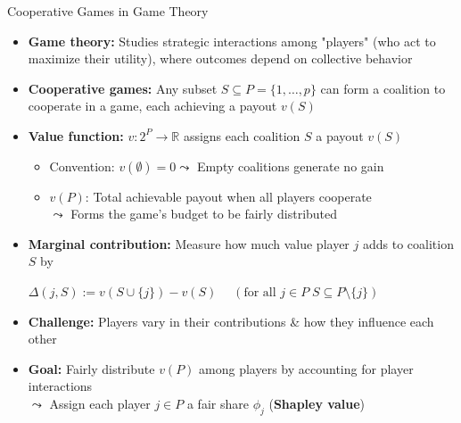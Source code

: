 \documentclass[11pt,compress,t,notes=noshow, aspectratio=169, xcolor=table]{beamer}
\begin{document}
\begin{frame}{Cooperative Games in Game Theory }
\begin{itemize}%
  \item \textbf{Game theory:} Studies strategic interactions among "players" (who act to maximize their utility), where outcomes depend on collective behavior
  \item \textbf{Cooperative games:} Any subset $S \subseteq P = \{1, \ldots, p\}$ can form a coalition to cooperate in a game, each achieving a payout $v(S)$
  \pause
  \item \textbf{Value function:} $v: 2^P \rightarrow \mathbb{R}$ assigns each coalition $S$ a payout $v(S)$ 
  \begin{itemize}
      \item Convention: $v(\emptyset) = 0 \leadsto$  Empty coalitions generate no gain
      \item $v(P)$: Total achievable payout when all players cooperate\\
      $\leadsto$ Forms the game's budget to be fairly distributed
  \end{itemize}%
    \item \textbf{Marginal contribution:} Measure how much value player \(j\) adds to coalition \( S \) by

    \medskip
    
    \centerline{$\Delta (j, S) := v(S \cup \{j\}) - v(S) \quad \; \left(\text{for all } j \in P \; S \subseteq P \setminus \{j\}\right)$}

    \medskip
    
  \item \textbf{Challenge:} Players vary in their contributions \& how they influence each other
  \item \textbf{Goal:} Fairly distribute $v(P)$ among players by accounting for player interactions\\
  $\leadsto$ Assign each player $j \in P$ a fair share $\phi_j$ (\textbf{Shapley value}) 
\end{itemize}
\end{frame}
\end{document}
